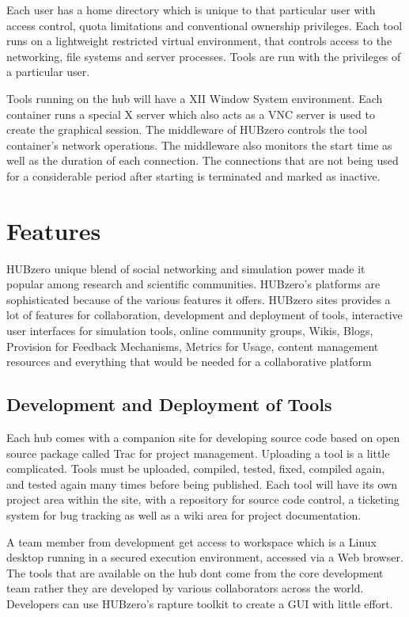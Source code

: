 \documentclass[9pt,twocolumn,twoside]{../../styles/osajnl}
\begin{document}
Each user has a home directory which is unique to that particular user
with access control, quota limitations and conventional ownership
privileges. Each tool runs on a lightweight restricted virtual
environment, that controls access to the networking, file systems and
server processes. Tools are run with the privileges of a particular
user\cite{mclennan2010hubzero}.

Tools running on the hub will have a XII Window System environment.
Each container runs a special X server which also acts as a VNC server
is used to create the graphical session. The middleware of HUBzero
controls the tool container's network operations. The middleware also
monitors the start time as well as the duration of each
connection. The connections that are not being used for a considerable
period after starting is terminated and marked as
inactive\cite{hubzeropurduewebpage}.

\section{Features}
HUBzero unique blend of social networking and simulation power made it
popular among research and scientific communities. HUBzero's platforms
are sophisticated because of the various features it offers. HUBzero
sites provides a lot of features for collaboration, development and
deployment of tools, interactive user interfaces for simulation tools,
online community groups, Wikis, Blogs, Provision for Feedback
Mechanisms, Metrics for Usage, content management resources and
everything that would be needed for a collaborative platform

\subsection{Development and Deployment of Tools}
Each hub comes with a companion site for developing source code based
on open source package called Trac for project management. Uploading a
tool is a little complicated. Tools must be uploaded, compiled,
tested, fixed, compiled again, and tested again many times before
being published. Each tool will have its own project area within the
site, with a repository for source code control, a ticketing system
for bug tracking as well as a wiki area for project documentation.

A team member from development get access to workspace which is a
Linux desktop running in a secured execution environment, accessed via
a Web browser. The tools that are available on the hub dont come from
the core development team rather they are developed by various
collaborators across the world. Developers can use HUBzero's rapture
toolkit to create a GUI with little effort\cite{hubzerofeatures}.
\end{document}

